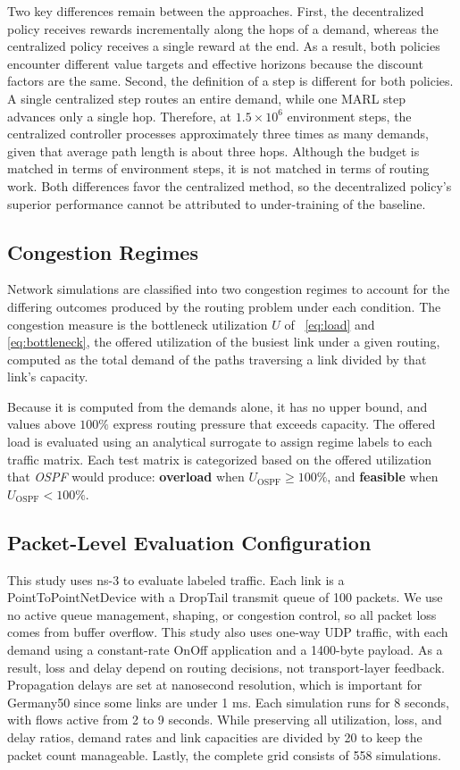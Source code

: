 Two key differences remain between the approaches. First, the decentralized policy receives rewards incrementally along the hops of a demand, whereas the centralized policy receives a single reward at the end. As a result, both policies encounter different value targets and effective horizons because the discount factors are the same. Second, the definition of a step is different for both policies. A single centralized step routes an entire demand, while one MARL step advances only a single hop. Therefore, at $1.5\times10^{6}$ environment steps, the centralized controller processes approximately three times as many demands, given that average path length is about three hops. Although the budget is matched in terms of environment steps, it is not matched in terms of routing work. Both differences favor the centralized method, so the decentralized policy's superior performance cannot be attributed to under-training of the baseline.


\subsection{Congestion Regimes}
\label{sec:setup-regimes}
Network simulations are classified into two congestion regimes to account for the differing outcomes produced by the routing problem under each condition. The congestion measure is the bottleneck utilization $U$ of ~\eqref{eq:load} and \eqref{eq:bottleneck}, the offered utilization of the busiest link under a given routing, computed as the total demand of the paths traversing a link divided by that link's capacity.

Because it is computed from the demands alone, it has no upper bound, and values above $100\%$ express routing pressure that exceeds capacity. The offered load is evaluated using an analytical surrogate to assign regime labels to each traffic matrix. Each test matrix is categorized based on the offered utilization that \emph{OSPF} would produce: \textbf{overload} when $U_{\mathrm{OSPF}}\ge100\%$, and \textbf{feasible} when $U_{\mathrm{OSPF}}<100\%$.

\subsection{Packet-Level Evaluation Configuration}
\label{sec:setup-ns3}


This study uses ns-3 to evaluate labeled traffic. Each link is a PointToPointNetDevice with a DropTail transmit queue of 100 packets. We use no active queue management, shaping, or congestion control, so all packet loss comes from buffer overflow. This study also uses one-way UDP traffic, with each demand using a constant-rate OnOff application and a 1400-byte payload. As a result, loss and delay depend on routing decisions, not transport-layer feedback. Propagation delays are set at nanosecond resolution, which is important for Germany50 since some links are under 1 ms. Each simulation runs for 8 seconds, with flows active from 2 to 9 seconds. While preserving all utilization, loss, and delay ratios, demand rates and link capacities are divided by 20 to keep the packet count manageable. Lastly, the complete grid consists of 558 simulations.

